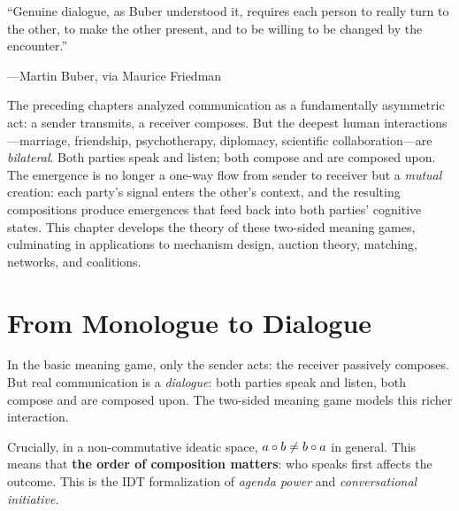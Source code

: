 \epigraph{``Genuine dialogue, as Buber understood it, requires each person
to really turn to the other, to make the other present, and to be willing
to be changed by the encounter.''}
{---Martin Buber, via Maurice Friedman}

The preceding chapters analyzed communication as a fundamentally asymmetric
act: a sender transmits, a receiver composes. But the deepest human
interactions---marriage, friendship, psychotherapy, diplomacy, scientific
collaboration---are \emph{bilateral}. Both parties speak and listen; both
compose and are composed upon. The emergence is no longer a one-way flow
from sender to receiver but a \emph{mutual} creation: each party's signal
enters the other's context, and the resulting compositions produce emergences
that feed back into both parties' cognitive states. This chapter develops the
theory of these two-sided meaning games, culminating in applications to
mechanism design, auction theory, matching, networks, and coalitions.


\section{From Monologue to Dialogue}

In the basic meaning game, only the sender acts: the receiver passively
composes. But real communication is a \emph{dialogue}: both parties speak
and listen, both compose and are composed upon. The two-sided meaning game
models this richer interaction.

Crucially, in a non-commutative ideatic space, $a \circ b \neq b \circ a$
in general. This means that \textbf{the order of composition matters}:
who speaks first affects the outcome. This is the IDT formalization of
\emph{agenda power} and \emph{conversational initiative}.

